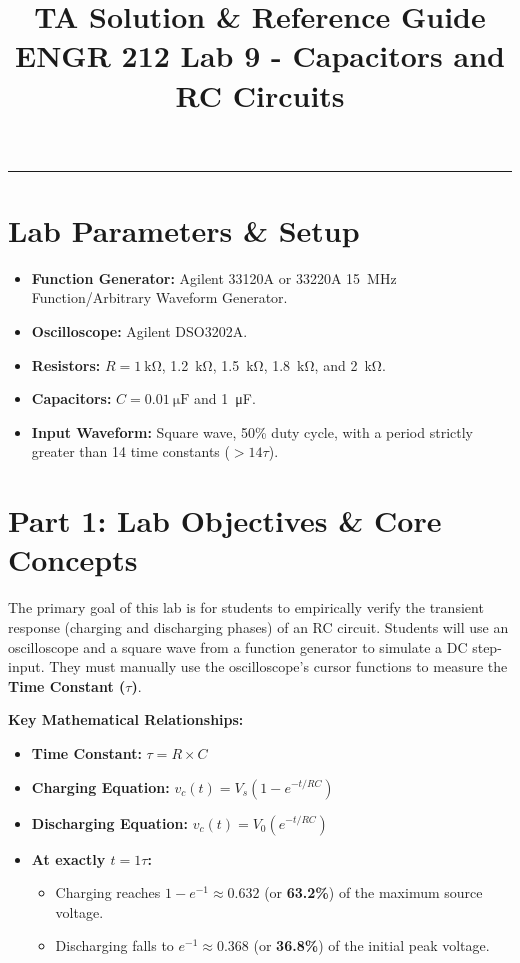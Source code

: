 \documentclass[11pt]{article}
\title{\vspace{-1in}\textbf{TA Solution \& Reference Guide} \\ \Large ENGR 212 Lab 9 - Capacitors and RC Circuits}
\author{}
\date{}
\begin{document}
\maketitle
\vspace{-0.5in}
\hrule
\vspace{0.2in}

\section*{Lab Parameters \& Setup}
\begin{itemize}
  \item \textbf{Function Generator:} Agilent 33120A or 33220A \SI{15}{\mega\hertz} Function/Arbitrary Waveform Generator.
  \item \textbf{Oscilloscope:} Agilent DSO3202A.
  \item \textbf{Resistors:} $R = \SI{1}{\kilo\ohm}$, \SI{1.2}{\kilo\ohm}, \SI{1.5}{\kilo\ohm}, \SI{1.8}{\kilo\ohm}, and \SI{2}{\kilo\ohm}.
  \item \textbf{Capacitors:} $C = \SI{0.01}{\micro\farad}$ and \SI{1}{\micro\farad}.
  \item \textbf{Input Waveform:} Square wave, 50\% duty cycle, with a period strictly greater than 14 time constants ($>14\tau$).
\end{itemize}

\vspace{0.2in}
\section*{Part 1: Lab Objectives \& Core Concepts}

The primary goal of this lab is for students to empirically verify the transient response (charging and discharging phases) of an RC circuit. Students will use an oscilloscope and a square wave from a function generator to simulate a DC step-input. They must manually use the oscilloscope's cursor functions to measure the \textbf{Time Constant ($\tau$)}.

\textbf{Key Mathematical Relationships:}
\begin{itemize}
  \item \textbf{Time Constant:} $\tau = R \times C$
  \item \textbf{Charging Equation:} $v_c(t) = V_s(1 - e^{-t/RC})$
  \item \textbf{Discharging Equation:} $v_c(t) = V_0(e^{-t/RC})$
  \item \textbf{At exactly $t = 1\tau$:}
    \begin{itemize}
      \item Charging reaches $1 - e^{-1} \approx 0.632$ (or \textbf{63.2\%}) of the maximum source voltage.
      \item Discharging falls to $e^{-1} \approx 0.368$ (or \textbf{36.8\%}) of the initial peak voltage.
    \end{itemize}
\end{itemize}
\end{document}
